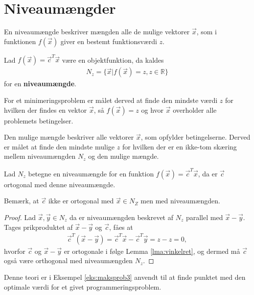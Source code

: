 \section{Niveaumængder}

En niveaumængde beskriver mængden alle de mulige vektorer $\vec{x}$, som i funktionen $f(\vec{x})$ giver en bestemt funktionsværdi $z$. 
\begin{defn}[Niveaumængde]
Lad $f(\vec{x})= \vec{c}^T\vec{x}$ være en objektfunktion, da kaldes
\begin{align*}
N_z = \{\vec{x}| f(\vec{x}) = z, z \in \mathds{R}\}
\end{align*}
for en \textbf{niveaumængde}.
\end{defn}

For et minimeringsproblem er målet derved at finde den mindste værdi $z$ for hvilken der findes en vektor $\vec{x}$, så $f(\vec{x})=z$ og hvor $\vec{x}$ overholder alle problemets betingelser.

Den mulige mængde beskriver alle vektorer $\vec{x}$, som opfylder betingelserne. Derved er målet at finde den mindste mulige $z$ for hvilken der er en ikke-tom skæring mellem niveaumængden $N_z$ og den mulige mængde.

\begin{stn}
Lad $N_z$ betegne en niveaumængde for en funktion $f(\vec{x})=\vec{c}^T\vec{x}$, da er $\vec{c}$ ortogonal med denne niveaumængde.
\end{stn}

Bemærk, at $\vec{c}$ ikke er ortogonal med $\vec{x}\in N_Z$ men med niveaumængden.
\begin{proof}
Lad $\vec{x}, \vec{y} \in N_z$ da er niveaumængden beskrevet af $N_z$ parallel med $\vec{x}-\vec{y}$.
Tages prikproduktet af $\vec{x}-\vec{y}$ og $\vec{c}$, fåes at
\begin{align*}
\vec{c}^T(\vec{x}-\vec{y}) = \vec{c}^T\vec{x} -\vec{c}^T\vec{y} = z - z = 0,
\end{align*}
hvorfor $\vec{c}$ og $\vec{x}-\vec{y}$ er ortogonale i følge Lemma \ref{lma:vinkelret}, og dermed må $\vec{c}$ også være orthogonal med niveaumængden $N_z$.
\end{proof}

Denne teori er i Eksempel \ref{eks:maksprob3} anvendt til at finde punktet med den optimale værdi for et givet programmeringsproblem.

